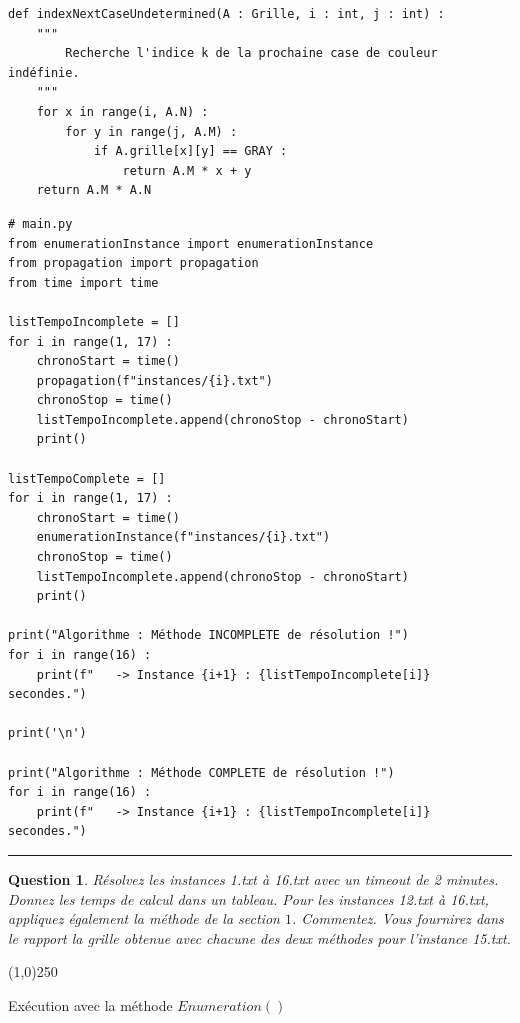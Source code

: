 \documentclass[a4paper,12pt]{article}
\newtheorem{exo}{Question}
\begin{document}
\begin{lstlisting}
def indexNextCaseUndetermined(A : Grille, i : int, j : int) :
    """
        Recherche l'indice k de la prochaine case de couleur indéfinie.
    """
    for x in range(i, A.N) :
        for y in range(j, A.M) :
            if A.grille[x][y] == GRAY :
                return A.M * x + y
    return A.M * A.N
\end{lstlisting}


\newpage

\begin{lstlisting}
# main.py
from enumerationInstance import enumerationInstance
from propagation import propagation
from time import time

listTempoIncomplete = []
for i in range(1, 17) :
    chronoStart = time()
    propagation(f"instances/{i}.txt")
    chronoStop = time()
    listTempoIncomplete.append(chronoStop - chronoStart)
    print()
    
listTempoComplete = []
for i in range(1, 17) :
    chronoStart = time()
    enumerationInstance(f"instances/{i}.txt")
    chronoStop = time()
    listTempoIncomplete.append(chronoStop - chronoStart)
    print()
    
print("Algorithme : Méthode INCOMPLETE de résolution !")
for i in range(16) :
    print(f"   -> Instance {i+1} : {listTempoIncomplete[i]} secondes.")
    
print('\n')
    
print("Algorithme : Méthode COMPLETE de résolution !")
for i in range(16) :
    print(f"   -> Instance {i+1} : {listTempoIncomplete[i]} secondes.")
\end{lstlisting}

\noindent\rule{\textwidth}{1pt}
\newpage


\begin{exo}
	Résolvez les instances 1.txt à 16.txt avec un timeout de 2 minutes. Donnez les temps de calcul dans un tableau. Pour les instances 12.txt à 16.txt, appliquez également la méthode de la section $1$. Commentez. Vous fournirez dans le rapport la grille obtenue avec chacune des deux méthodes pour l'instance 15.txt.
\end{exo}

 \begin{center}
   \line(1,0){250}
 \end{center}

\begin{center}Exécution avec la méthode $Enumeration()$\end{center}
\end{document}
